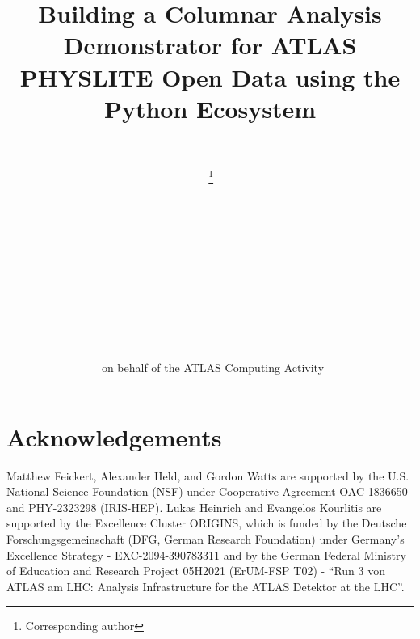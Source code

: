 \documentclass{latex/webofc}
\begin{document}
\linenumbers
%
\title{Building a Columnar Analysis Demonstrator for ATLAS PHYSLITE Open Data using the Python Ecosystem}

\author{ \, \and
  \,\fnsep\thanks{Corresponding author } \and
  \, \and
  \, \and
  \, \and
  \, \and
   \and
  \, \and
  \, \and
  \,
 on behalf of the ATLAS Computing Activity
}


\abstract{%
 
}
%
\maketitle
%





\section{Acknowledgements}\label{sec:acknowledgements}

Matthew Feickert, Alexander Held, and Gordon Watts are supported by the U.S. National Science Foundation (NSF) under Cooperative Agreement OAC-1836650 and PHY-2323298 (IRIS-HEP).
Lukas Heinrich and Evangelos Kourlitis are supported by the Excellence Cluster ORIGINS, which is funded by the Deutsche Forschungsgemeinschaft (DFG, German Research Foundation) under Germany's Excellence Strategy - EXC-2094-390783311 and by the German Federal Ministry of Education and Research Project 05H2021 (ErUM-FSP T02) - ``Run 3 von ATLAS am LHC: Analysis Infrastructure for the ATLAS Detektor at the LHC''.



\end{document}
